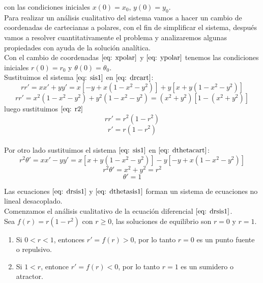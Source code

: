 \documentclass[12pt, a4paper]{report}
\begin{document}
con las condiciones iniciales $x(0)=x_0$, $y(0)=y_0$.\\

Para realizar un análisis cualitativo del sistema vamos a hacer un cambio
de coordenadas de cartecianas a polares, con el fin de simplificar
el sistema, después vamos a resolver cuantitativamente el  problema y
analizaremos algunas propiedades con ayuda de la solución analítica.\\

Con el cambio de coordenadas $\eqref{eq: xpolar}$ y  $\eqref{eq: ypolar}$ tenemos
las condiciones iniciales $r(0)=r_0$ y $\theta(0)=\theta_0$.\\

Sustituimos el sistema $\eqref{eq: sis1}$ en $\eqref{eq: drcart}$:
$$rr'=xx'+yy'=x[-y+x(1-x^2-y^2)]+y[x+y(1-x^2-y^2)]$$
$$rr'=x^2(1-x^2-y^2)+y^2(1-x^2-y^2)=(x^2+y^2)[1-(x^2+y^2)]$$
luego sustituimos $\eqref{eq: r2}$
$$rr'=r^2(1-r^2)$$
\begin{equation}\label{eq: drsis1}
	r'=r(1-r^2)
\end{equation}\\

Por otro lado sustituimos el sistema $\eqref{eq: sis1}$ en $\eqref{eq: dthetacart}$:
$$r^2\theta'=xx'-yy'=x[x+y(1-x^2-y^2)]-y[-y+x(1-x^2-y^2)]$$
$$r^2\theta'=x^2+y^2=r^2$$
\begin{equation}\label{eq: dthetasis1}
	\theta'=1
\end{equation}

Las ecuaciones $\eqref{eq: drsis1}$ y $\eqref{eq: dthetasis1}$ 
forman un sistema de ecuaciones no lineal desacoplado.\\

Comenzamos el análisis cualitativo de la ecuación diferencial $\eqref{eq: drsis1}$.\\

Sea $f(r)=r(1-r^2)$ con $r\geq0$, las soluciones de equilibrio son $r=0$ y $r=1$.
\begin{enumerate}
	\item Si $0<r<1$, entonces $r'=f(r)>0$, por lo tanto $r=0$ es un punto fuente o repulsivo.
	\item Si $1<r$, entonce $r'=f(r)<0$, por lo tanto $r=1$ es un sumidero o atractor.
\end{enumerate}\\
\end{document}
